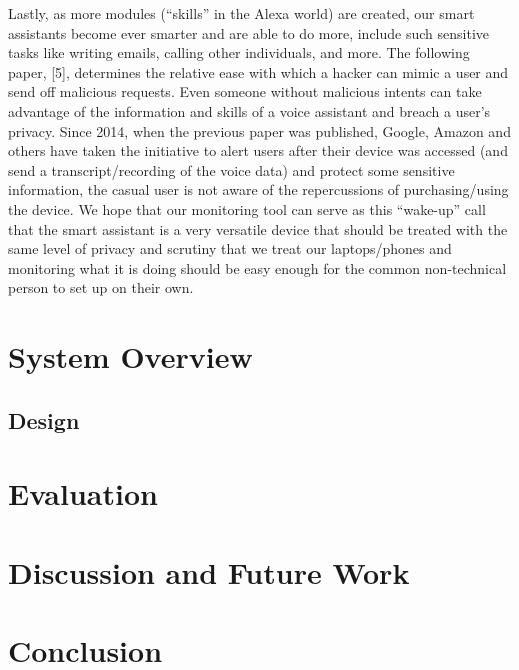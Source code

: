 \documentclass[letterpaper,twocolumn,10pt]{article}
\begin{document}
Lastly, as more modules (“skills” in the Alexa world) are created, our smart assistants become ever smarter and are able to do more, include such sensitive tasks like writing emails, calling other individuals, and more. The following paper, [5], determines the relative ease with which a hacker can mimic a user and send off malicious requests. Even someone without malicious intents can take advantage of the information and skills of a voice assistant and breach a user’s privacy. Since 2014, when the previous paper was published, Google, Amazon and others have taken the initiative to alert users after their device was accessed (and send a transcript/recording of the voice data) and protect some sensitive information, the casual user is not aware of the repercussions of purchasing/using the device. We hope that our monitoring tool can serve as this “wake-up” call that the smart assistant is a very versatile device that should be treated with the same level of privacy and scrutiny that we treat our laptops/phones and monitoring what it is doing should be easy enough for the common non-technical person to set up on their own.

\section{System Overview}

\subsection{Design}

\section{Evaluation}

\section{Discussion and Future Work}

\section{Conclusion}




\end{document}
